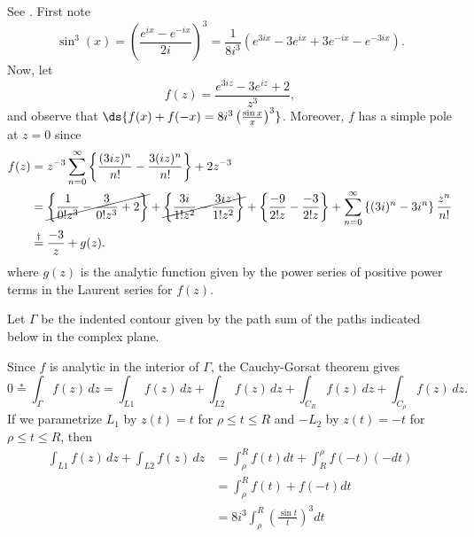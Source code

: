 \documentclass{homework}
\begin{document}
\begin{solution}
See \cite[ch.~7.75 p.~269]{brown04}.  First note
  $$
    \sin^3(x) = \left(\frac{e^{ix} - e^{-ix}}{2i}\right)^3
    = \frac{1}{8i^3}(e^{3ix} - 3e^{ix} + 3e^{-ix} - e^{-3ix}).
  $$
  Now, let
  $$
    f(z) = \frac{e^{3iz} - 3e^{iz} + 2}{z^3},
  $$
  and observe that $\ds{f(x) + f(-x) = 8i^3\left(\frac{\sin x}{x}\right)^3}$. Moreover, $f$ has a simple pole at $z=0$ since
  \begin{align*}
    f(z) 
    &= z^{-3} \sum_{n=0}^\infty \left\{\frac{(3iz)^n}{n!} - \frac{3(iz)^n}{n!}\right\} + 2z^{-3}\\
    &=  \cancel{\left\{ \frac{1}{0!z^3} - \frac{3}{0!z^3} + 2\right\}} 
      + \cancel{\left\{ \frac{3i}{1!z^2} - \frac{3iz}{1!z^2} \right\}} 
      + \left\{ \frac{-9}{2!z} - \frac{-3}{2!z} \right\}
      + \sum_{n=0}^\infty\left\{(3i)^n - 3i^n\right\}\frac{z^n}{n!}\\
    &\stackrel{\dagger}= \frac{-3}{z} + g(z).
  \end{align*}
  where $g(z)$ is the analytic function given by the power series of positive power terms in the Laurent series for $f(z)$.

  Let $\Gamma$ be the indented contour given by the path sum of the paths indicated below in the complex plane.

  \begin{center}
  \end{center}

Since $f$ is analytic in the interior of $\Gamma$, the Cauchy-Gorsat theorem gives
$$
  0 \stackrel*= \int_{\Gamma} f(z)\,dz = \int_{L1} f(z)\,dz + \int_{L2} f(z)\,dz + \int_{C_R} f(z)\,dz + \int_{C_\rho} f(z)\,dz.
$$
If we parametrize $L_1$ by $z(t) = t$ for $\rho\le t \le R$ and $-L_2$ by $z(t) = -t$ for $\rho\le t\le R$, then
\begin{align*}
  \int_{L1} f(z)\,dz + \int_{L2} f(z)\,dz 
  &= \int_\rho^R f(t)dt + \int_R^\rho f(-t)(-dt) \\
  &= \int_\rho^R f(t) + f(-t)dt\\
  &= 8i^3\int_\rho^R \left(\frac{\sin t}{t}\right)^3dt
\end{align*}


\end{solution}
\end{document}
